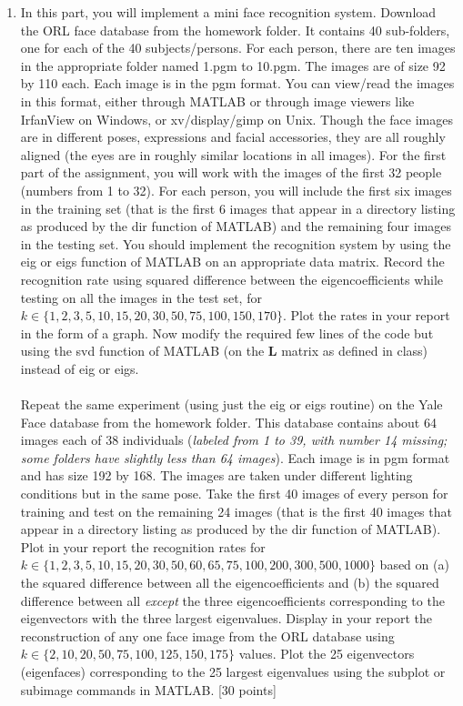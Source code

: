 \documentclass[11pt]{article}
\begin{document}
\begin{enumerate}
\item In this part, you will implement a mini face recognition system. Download the ORL face database from the homework folder. It contains 40 sub-folders, one for each of the 40 subjects/persons. For each person, there are ten images in the appropriate folder named 1.pgm to 10.pgm. The images are of size 92 by 110 each. Each image is in the pgm format. You can view/read the images in this format, either through MATLAB or through image viewers like IrfanView on Windows, or xv/display/gimp on Unix. Though the face images are in different poses, expressions and facial accessories, they are all roughly aligned (the eyes are in roughly similar locations in all images). For the first part of the assignment, you will work with the images of the first 32 people (numbers from 1 to 32). For each person, you will include the first six images in the training set (that is the first 6 images that appear in a directory listing as produced by the \textsf{dir} function of MATLAB) and the remaining four images in the testing set. You should implement the recognition system by using the \textsf{eig} or \textsf{eigs} function of MATLAB on an appropriate data matrix. Record the recognition rate using squared difference between the eigencoefficients while testing on all the images in the test set, for $k \in \{1,2,3,5,10,15,20,30,50,75,100,150,170\}$. Plot the rates in your report in the form of a graph. Now modify the required few lines of the code but using the \textsf{svd} function of MATLAB (on the $\boldsymbol{L}$ matrix as defined in class) instead of \textsf{eig} or \textsf{eigs}.
\\
\\
Repeat the same experiment (using just the \textsf{eig} or \textsf{eigs} routine) on the Yale Face database from the homework folder. This database contains about 64 images each of 38 individuals (\textit{labeled from 1 to 39, with number 14 missing; some folders have slightly less than 64 images}). Each image is in pgm format and has size 192 by 168. The images are taken under different lighting conditions but in the same pose. Take the first 40 images of every person for training and test on the remaining 24 images (that is the first 40 images that appear in a directory listing as produced by the \textsf{dir} function of MATLAB). Plot in your report the recognition rates for $k \in \{1,2,3,5,10,15,20,30,50,60, 65,75,100,200,300,500,1000\}$ based on (a) the squared difference between all the eigencoefficients and (b) the squared difference between all \emph{except} the three eigencoefficients corresponding to the eigenvectors with the three largest eigenvalues. Display in your report the reconstruction of any one face image from the ORL database using $k \in \{2,10,20,50,75,100,125, 150,175\}$ values. Plot the 25 eigenvectors (eigenfaces) corresponding to the 25 largest eigenvalues using the subplot or subimage commands in MATLAB. \textsf{[30 points]}


\end{enumerate}
\end{document}
